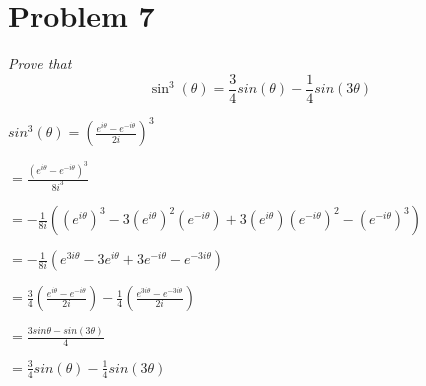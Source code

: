 \documentclass[12pt]{article}
\begin{document}
\section{Problem 7}
\textit{Prove that}
$$\sin^3(\theta) = \frac{3}{4} sin(\theta) - \frac{1}{4}sin(3\theta)$$

\begin{enumerate}
{\Large
\item[1. ] $sin^3(\theta) = (\frac{e^{i\theta}-e^{-i\theta}}{2i})^3$
\item[2. ]  \hspace{7ex} $ = \frac{(e^{i\theta} - e^{-i\theta})^3}{8i^3}$
\item[3. ]  \hspace{7ex} $ = -\frac{1}{8i}((e^{i\theta})^3 - 3(e^{i\theta})^2(e^{-i\theta})
+ 3(e^{i\theta})(e^{-i\theta})^2 - (e^{-i\theta})^3)$
\item[4. ] \hspace{7ex} $ = -\frac{1}{8i}(e^{3i\theta} - 3e^{i\theta} 
+ 3e^{-i\theta} - e^{-3i\theta})$
\item[5. ] \hspace{7ex} $ = \frac{3}{4}(\frac{e^{i\theta} - e^{-i\theta}}{2i}) - 
\frac{1}{4}(\frac{e^{3i\theta} - e^{-3i\theta}}{2i})$
\item[6. ] \hspace{7ex} $ = \frac{3 sin \theta - sin (3\theta)}{4}$
\item[7. ] \hspace{7ex} $ = \frac{3}{4} sin(\theta) - \frac{1}{4}sin(3\theta)$
}
\end{enumerate}


\end{document}
